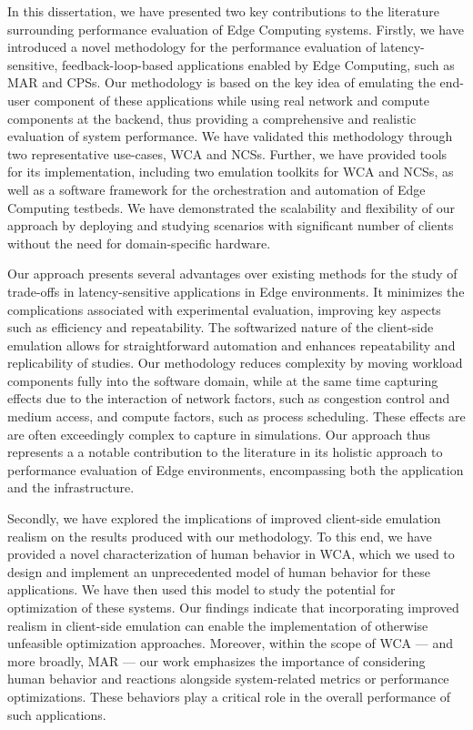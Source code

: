 In this dissertation, we have presented two key contributions to the literature surrounding performance evaluation of Edge Computing systems.
Firstly, we have introduced a novel methodology for the performance evaluation of latency-sensitive, feedback-loop-based applications enabled by Edge Computing, such as \gls{MAR} and \glspl{CPS}.
Our methodology is based on the key idea of emulating the end-user component of these applications while using real network and compute components at the backend, thus providing a comprehensive and realistic evaluation of system performance.
We have validated this methodology through two representative use-cases, \gls{WCA} and \glspl{NCS}.
Further, we have provided tools for its implementation, including two emulation toolkits for \gls{WCA} and \glspl{NCS}, as well as a software framework for the orchestration and automation of Edge Computing testbeds.
We have demonstrated the scalability and flexibility of our approach by deploying and studying scenarios with significant number of clients without the need for domain-specific hardware.

Our approach presents several advantages over existing methods for the study of trade-offs in latency-sensitive applications in Edge environments.
It minimizes the complications associated with experimental evaluation, improving key aspects such as efficiency and repeatability.
The softwarized nature of the client-side emulation allows for straightforward automation and enhances repeatability and replicability of studies.
Our methodology reduces complexity by moving workload components fully into the software domain, while at the same time capturing effects due to the interaction of network factors, such as congestion control and medium access, and compute factors, such as process scheduling.
These effects are are often exceedingly complex to capture in simulations.
Our approach thus represents a a notable contribution to the literature in its holistic approach to performance evaluation of Edge environments, encompassing both the application and the infrastructure.

Secondly, we have explored the implications of improved client-side emulation realism on the results produced with our methodology.
To this end, we have provided a novel characterization of human behavior in \gls{WCA}, which we used to design and implement an unprecedented model of human behavior for these applications.
We have then used this model to study the potential for optimization of these systems.
Our findings indicate that incorporating improved realism in client-side emulation can enable the implementation of otherwise unfeasible optimization approaches.
Moreover, within the scope of \gls{WCA} --- and more broadly, \gls{MAR} --- our work emphasizes the importance of considering human behavior and reactions alongside system-related metrics or performance optimizations.
These behaviors play a critical role in the overall performance of such applications.

